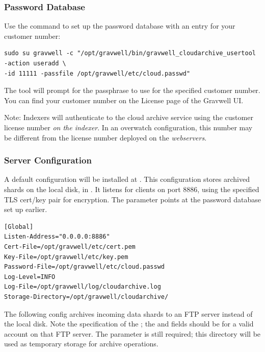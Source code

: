 {{\subsubsection{Password Database}

Use the  command to set up the password database with an entry for your customer number:

\begin{verbatim}
sudo su gravwell -c "/opt/gravwell/bin/gravwell_cloudarchive_usertool -action useradd \
-id 11111 -passfile /opt/gravwell/etc/cloud.passwd"
\end{verbatim}

The tool will prompt for the passphrase to use for the specified customer number. You can find your customer number on the License page of the Gravwell UI.

Note: Indexers will authenticate to the cloud archive service using the customer license number \emph{on the indexer}. In an overwatch configuration, this number may be different from the license number deployed on the \emph{webservers}.

\subsubsection{Server Configuration}

A default configuration will be installed at . This configuration stores archived shards on the local disk, in . It listens for clients on port 8886, using the specified TLS cert/key pair for encryption. The  parameter points at the password database set up earlier.

\begin{verbatim}
[Global]
Listen-Address="0.0.0.0:8886"
Cert-File=/opt/gravwell/etc/cert.pem
Key-File=/opt/gravwell/etc/key.pem
Password-File=/opt/gravwell/etc/cloud.passwd
Log-Level=INFO
Log-File=/opt/gravwell/log/cloudarchive.log
Storage-Directory=/opt/gravwell/cloudarchive/
\end{verbatim}

The following config archives incoming data shards to an FTP server instead of the local disk. Note the specification of the ; the  and  fields should be for a valid account on that FTP server. The  parameter is still required; this directory will be used as temporary storage for archive operations.

}}
